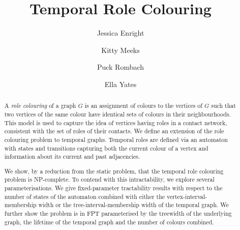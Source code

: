 \documentclass[runningheads]{llncs}
\begin{document}
%
\title{Temporal Role Colouring}
%
%
\author{Jessica Enright  \and
Kitty Meeks  \and
Puck Rombach \and Ella Yates }
%
%
%
\maketitle              %
%
\begin{abstract}
A \textit{role colouring} of a graph $G$ is an assignment of colours to the vertices of $G$ such that two vertices of the same 
colour have identical sets of colours in their neighbourhoods.  This model is used to capture the idea of vertices having roles in a contact network, consistent with the set of roles of their contacts.  
We define an extension of the role colouring problem to temporal graphs.
Temporal roles are defined via an automaton with states and transitions capturing both the current colour of a vertex and information about its current and past adjacencies. 
 
We show, by a reduction from the static problem, that the temporal role colouring problem is NP-complete. To contend with this intractability, we explore several parameterisations. We give fixed-parameter tractability results with respect to the number of states of the automaton combined with either the vertex-interval-membership width or the tree-interval-membership width of the temporal graph. We further show the problem is in FPT parameterised by the treewidth of the underlying graph, the lifetime of the temporal graph and the number of colours combined.

\end{abstract}
%
%
%
\end{document}
